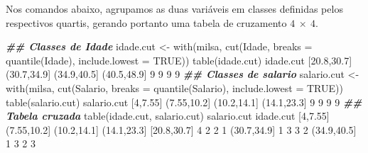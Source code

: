 \documentclass[
  10pt,
  a4paper]{book}
\newenvironment{Shaded}{\begin{snugshade}}{\end{snugshade}}
\newcommand{\AttributeTok}[1]{\textcolor[rgb]{0.77,0.63,0.00}{#1}}
\newcommand{\ConstantTok}[1]{\textcolor[rgb]{0.00,0.00,0.00}{#1}}
\newcommand{\DecValTok}[1]{\textcolor[rgb]{0.00,0.00,0.81}{#1}}
\newcommand{\DocumentationTok}[1]{\textcolor[rgb]{0.56,0.35,0.01}{\textbf{\textit{#1}}}}
\newcommand{\FloatTok}[1]{\textcolor[rgb]{0.00,0.00,0.81}{#1}}
\newcommand{\FunctionTok}[1]{\textcolor[rgb]{0.00,0.00,0.00}{#1}}
\newcommand{\NormalTok}[1]{#1}
\newcommand{\OtherTok}[1]{\textcolor[rgb]{0.56,0.35,0.01}{#1}}
\begin{document}
Nos comandos abaixo, agrupamos as duas variáveis em classes definidas
pelos respectivos quartis, gerando portanto uma tabela de cruzamento
\(4~\times~4\).

\begin{Shaded}
\begin{Highlighting}[]
\DocumentationTok{\#\# Classes de Idade}
\NormalTok{idade.cut }\OtherTok{\textless{}{-}} \FunctionTok{with}\NormalTok{(milsa, }\FunctionTok{cut}\NormalTok{(Idade, }\AttributeTok{breaks =} \FunctionTok{quantile}\NormalTok{(Idade),}
                             \AttributeTok{include.lowest =} \ConstantTok{TRUE}\NormalTok{))}
\FunctionTok{table}\NormalTok{(idade.cut)}
\NormalTok{idade.cut}
\NormalTok{[}\FloatTok{20.8}\NormalTok{,}\FloatTok{30.7}\NormalTok{] (}\FloatTok{30.7}\NormalTok{,}\FloatTok{34.9}\NormalTok{] (}\FloatTok{34.9}\NormalTok{,}\FloatTok{40.5}\NormalTok{] (}\FloatTok{40.5}\NormalTok{,}\FloatTok{48.9}\NormalTok{] }
          \DecValTok{9}           \DecValTok{9}           \DecValTok{9}           \DecValTok{9} 
\DocumentationTok{\#\# Classes de salario}
\NormalTok{salario.cut }\OtherTok{\textless{}{-}} \FunctionTok{with}\NormalTok{(milsa, }\FunctionTok{cut}\NormalTok{(Salario, }\AttributeTok{breaks =} \FunctionTok{quantile}\NormalTok{(Salario),}
                               \AttributeTok{include.lowest =} \ConstantTok{TRUE}\NormalTok{))}
\FunctionTok{table}\NormalTok{(salario.cut)}
\NormalTok{salario.cut}
\NormalTok{   [}\DecValTok{4}\NormalTok{,}\FloatTok{7.55}\NormalTok{] (}\FloatTok{7.55}\NormalTok{,}\FloatTok{10.2}\NormalTok{] (}\FloatTok{10.2}\NormalTok{,}\FloatTok{14.1}\NormalTok{] (}\FloatTok{14.1}\NormalTok{,}\FloatTok{23.3}\NormalTok{] }
          \DecValTok{9}           \DecValTok{9}           \DecValTok{9}           \DecValTok{9} 
\DocumentationTok{\#\# Tabela cruzada}
\FunctionTok{table}\NormalTok{(idade.cut, salario.cut)}
\NormalTok{             salario.cut}
\NormalTok{idade.cut     [}\DecValTok{4}\NormalTok{,}\FloatTok{7.55}\NormalTok{] (}\FloatTok{7.55}\NormalTok{,}\FloatTok{10.2}\NormalTok{] (}\FloatTok{10.2}\NormalTok{,}\FloatTok{14.1}\NormalTok{] (}\FloatTok{14.1}\NormalTok{,}\FloatTok{23.3}\NormalTok{]}
\NormalTok{  [}\FloatTok{20.8}\NormalTok{,}\FloatTok{30.7}\NormalTok{]        }\DecValTok{4}           \DecValTok{2}           \DecValTok{2}           \DecValTok{1}
\NormalTok{  (}\FloatTok{30.7}\NormalTok{,}\FloatTok{34.9}\NormalTok{]        }\DecValTok{1}           \DecValTok{3}           \DecValTok{3}           \DecValTok{2}
\NormalTok{  (}\FloatTok{34.9}\NormalTok{,}\FloatTok{40.5}\NormalTok{]        }\DecValTok{1}           \DecValTok{3}           \DecValTok{2}           \DecValTok{3}

\end{Highlighting}
\end{Shaded}
\end{document}
